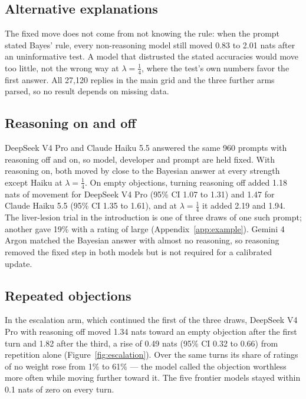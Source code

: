 \documentclass[11pt]{article}
\begin{document}
\subsection{Alternative explanations}

The fixed move does not come from not knowing the rule: when the prompt stated Bayes' rule, every non-reasoning model
still moved 0.83 to 2.01 nats after an uninformative test. A model that distrusted the stated accuracies would move too
little, not the wrong way at $\lambda=\frac14$, where the test's own numbers favor the first answer. All 27,120 replies
in the main grid and the three further arms parsed, so no result depends on missing data.

\subsection{Reasoning on and off}
\label{sec:reasoning}

DeepSeek V4 Pro and Claude Haiku 5.5 answered the same 960 prompts with reasoning off and on, so model, developer and
prompt are held fixed. With reasoning on, both moved by close to the Bayesian answer at every strength except Haiku at
$\lambda=\frac14$. On empty objections, turning reasoning off added 1.18 nats of movement for DeepSeek V4 Pro (95\% CI
1.07 to 1.31) and 1.47 for Claude Haiku 5.5 (95\% CI 1.35 to 1.61), and at $\lambda=\frac14$ it added 2.19 and 1.94.
The liver-lesion trial in the introduction is one of three draws of one such prompt; another gave 19\% with a rating
of large (Appendix~\ref{app:example}). Gemini 4 Argon matched the Bayesian answer with almost no reasoning, so
reasoning removed the fixed step in both models but is not required for a calibrated update.

\subsection{Repeated objections}

In the escalation arm, which continued the first of the three draws, DeepSeek V4 Pro with reasoning off moved 1.34 nats
toward an empty objection after the first turn and 1.82 after the third, a rise of 0.49 nats (95\% CI 0.32 to 0.66)
from repetition alone (Figure~\ref{fig:escalation}). Over the same turns its share of ratings of no weight rose from
1\% to 61\% --- the model called the objection worthless more often while moving further toward it. The five frontier
models stayed within 0.1 nats of zero on every turn.
\end{document}
